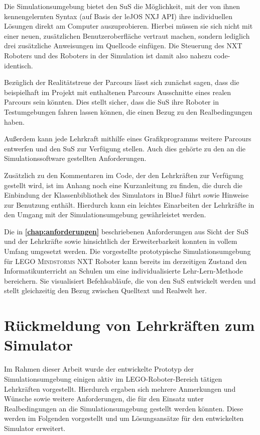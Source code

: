 \documentclass[paper=a4, DIV=calc, BCOR=12mm, twoside=on, onecolumn=on, open = right, titlepage =on, parskip =half-, headsepline = on, footsepline = off, chapterprefix = off, appendixprefix = on, fontsize = 12pt, numbers = noenddot, abstract = on]{scrbook}
\begin{document}
Die Simulationsumgebung bietet den SuS die Möglichkeit, mit der von ihnen kennengelernten Syntax (auf Basis der leJOS NXJ API) ihre individuellen Lösungen direkt am Computer auszuprobieren. Hierbei müssen sie sich nicht mit einer neuen, zusätzlichen Benutzeroberfläche vertraut machen, sondern lediglich drei zusätzliche Anweisungen im Quellcode einfügen. Die Steuerung des NXT Roboters und des Roboters in der Simulation ist damit also nahezu code-identisch.

Bezüglich der Realitätstreue der Parcours lässt sich zunächst sagen, dass die beispielhaft im Projekt mit enthaltenen Parcours Ausschnitte eines realen Parcours sein könnten. Dies stellt sicher, dass die SuS ihre Roboter in Testumgebungen fahren lassen können, die einen Bezug zu den Realbedingungen haben.

Außerdem kann jede Lehrkraft mithilfe eines Grafikprogramms weitere Parcours entwerfen und den SuS zur Verfügung stellen. Auch dies gehörte zu den an die Simulationssoftware gestellten Anforderungen.

Zusätzlich zu den Kommentaren im Code, der den Lehrkräften zur Verfügung gestellt wird, ist im Anhang noch eine Kurzanleitung zu finden, die durch die Einbindung der Klassenbibliothek des Simulators in BlueJ führt sowie Hinweise zur Benutzung enthält. Hierdurch kann ein leichtes Einarbeiten der Lehrkräfte in den Umgang mit der Simulationsumgebung gewährleistet werden. 

Die in \textbf{\ref{chap:anforderungen}} beschriebenen Anforderungen aus Sicht der SuS und der Lehrkräfte sowie hinsichtlich der Erweiterbarkeit konnten in vollem Umfang umgesetzt werden. Die vorgestellte prototypische Simulationsumgebung für \textsc{LEGO Mindstorms} NXT Roboter kann bereits im derzeitigen Zustand den Informatikunterricht an Schulen um eine individualisierte Lehr-Lern-Methode bereichern. Sie visualisiert Befehlsabläufe, die von den SuS entwickelt werden und stellt gleichzeitig den Bezug zwischen Quelltext und Realwelt her. 

\section{Rückmeldung von Lehrkräften zum Simulator}

Im Rahmen dieser Arbeit wurde der entwickelte Prototyp der Simulationsumgebung einigen aktiv im \textsc{LEGO}-Roboter-Bereich tätigen Lehrkräften vorgestellt. Hierdurch ergaben sich mehrere Anmerkungen und Wünsche sowie weitere Anforderungen, die für den Einsatz unter Realbedingungen an die Simulationsumgebung gestellt werden könnten. Diese werden im Folgenden vorgestellt und um Lösungsansätze für den entwickelten Simulator erweitert.
\end{document}
